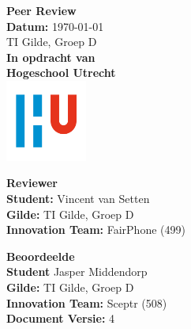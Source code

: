 \documentclass[a4paper]{article}
\begin{document}
\begin{titlepage}
  \begin{center}
      \vspace*{.9cm}
      \Huge
      \textbf{ Peer Review }\\
      \vspace{0.2cm}
      \small \textbf{Datum:} \today \\
      \small TI Gilde, Groep D \\

      \vspace{2cm}
      \normalsize
      \vspace{1cm}
      \Large
      \textbf{In opdracht van}\\
      \large
      \textbf{Hogeschool Utrecht} \\
      \includegraphics[width=0.2\textwidth]{Images/logouni.png}
      \vfill

      \begin{minipage}{0.45\textwidth}
        \large
        \textbf{Reviewer}\\
        \normalsize
        \textbf{Student:} Vincent van Setten \\
        \textbf{Gilde:} TI Gilde, Groep D\\
        \textbf{Innovation Team:} FairPhone (499) \\
        \vspace{2cm}
      \end{minipage}
      \hfill
      \begin{minipage}{0.45\textwidth}
        \large
        \textbf{Beoordeelde}\\
        \normalsize
        \textbf{Student} Jasper Middendorp  \\
        \textbf{Gilde:} TI Gilde, Groep D\\
        \textbf{Innovation Team:} Sceptr (508) \\
        \textbf{Document Versie:} 4 \\
        \vspace{2cm}
      \end{minipage}
    \end{center}
\end{titlepage}
\end{document}
